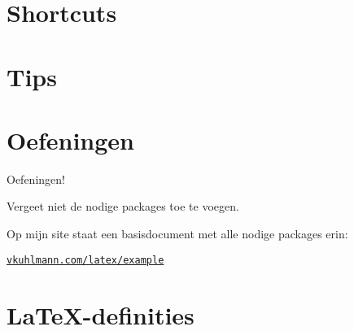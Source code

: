 \documentclass[
    dutch,
    everyoneauthor=true,
    defaultSlideCollection=vincent,
]{../../cursuspresentatie}
\let\placetarget\relax
\let\placetarget\relax
\begin{document}





\section{Shortcuts}

\def\placetarget{\hypertarget{shortcuts}{}}

\begin{frame}
    
\end{frame}



\section{Tips}

\def\placetarget{\hypertarget{tips}{}}


\begin{frame}
\end{frame}


\section{Oefeningen}

\def\placetarget{\hypertarget{oefeningen1}{}}

\begin{frame}
    \begin{center}
        {\LARGE Oefeningen!}
        \vspace{30pt}

        Vergeet niet de nodige packages toe te voegen.
        
        Op mijn site staat een basisdocument met alle nodige packages erin:

        \href{https://vkuhlmann.com/latex/example}{\nolinkurl{vkuhlmann.com/latex/example}}
    \end{center}
\end{frame}



\section{\LaTeX-definities}
\end{document}

